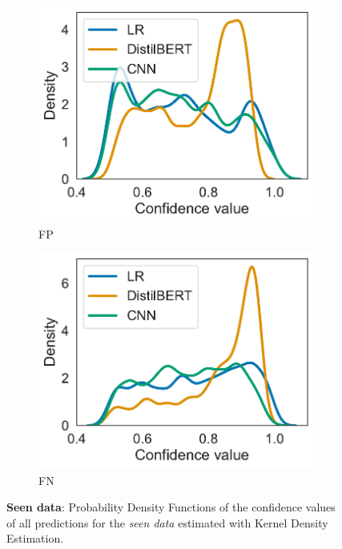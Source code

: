 \begin{figure}[H]
\begin{subfigure}{.35\textwidth}
        \centering
        \includegraphics[scale=.40]{Figures/confidence-densities-seen-fp.pdf}
        \caption{FP}
    \end{subfigure}
    \begin{subfigure}{.35\textwidth}
        \centering
        \includegraphics[scale=.40]{Figures/confidence-densities-seen-fn.pdf}
        \caption{FN}
    \end{subfigure}
    \caption{\textbf{Seen data}: Probability Density Functions of the confidence values of all predictions for the \emph{seen data} estimated with Kernel Density Estimation.}
    \label{fig:pdfs-seen}
\end{figure}

